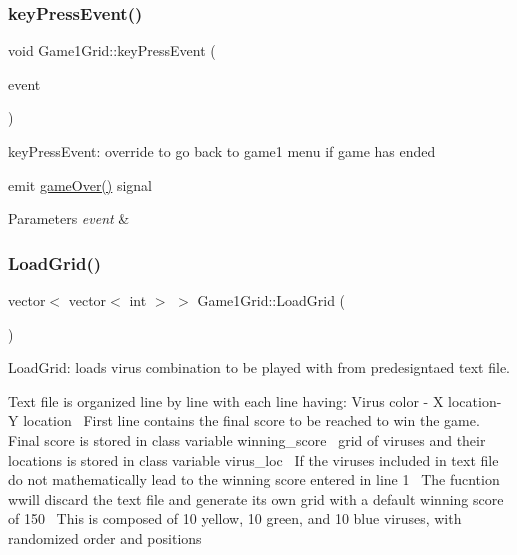\subsubsection{\texorpdfstring{key\+Press\+Event()}{keyPressEvent()}}
{\footnotesize\ttfamily void Game1\+Grid\+::key\+Press\+Event (\begin{DoxyParamCaption}\item[{Q\+Key\+Event $\ast$}]{event }\end{DoxyParamCaption})\hspace{0.3cm}{\ttfamily [override]}}



key\+Press\+Event\+: override to go back to game1 menu if game has ended 

emit \hyperlink{classGame1Grid_ae12a5e01c80683d7d8f3187d8b560a8c}{game\+Over()} signal 
\begin{DoxyParams}{Parameters}
{\em event} & \\
\hline
\end{DoxyParams}
\mbox{\label{classGame1Grid_a019f169cfa7cb777887ec2e8773c7e17}} 
\subsubsection{\texorpdfstring{Load\+Grid()}{LoadGrid()}}
{\footnotesize\ttfamily vector$<$ vector$<$ int $>$ $>$ Game1\+Grid\+::\+Load\+Grid (\begin{DoxyParamCaption}{ }\end{DoxyParamCaption})}



Load\+Grid\+: loads virus combination to be played with from predesigntaed text file. 

Text file is organized line by line with each line having\+: Virus color -\/ X location-\/ Y location~\newline
First line contains the final score to be reached to win the game.~\newline
Final score is stored in class variable winning\+\_\+score~\newline
grid of viruses and their locations is stored in class variable virus\+\_\+loc~\newline
If the viruses included in text file do not mathematically lead to the winning score entered in line 1~\newline
The fucntion wwill discard the text file and generate its own grid with a default winning score of 150~\newline
This is composed of 10 yellow, 10 green, and 10 blue viruses, with randomized order and positions

